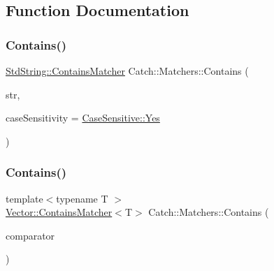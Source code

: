\subsection{Function Documentation}
\mbox{\label{namespace_catch_1_1_matchers_a1f6c2accdc6cd75a84d7112dcad647b4}} 
\subsubsection{\texorpdfstring{Contains()}{Contains()}\hspace{0.1cm}{\footnotesize\ttfamily [1/2]}}
{\footnotesize\ttfamily \mbox{\hyperlink{struct_catch_1_1_matchers_1_1_std_string_1_1_contains_matcher}{Std\+String\+::\+Contains\+Matcher}} Catch\+::\+Matchers\+::\+Contains (\begin{DoxyParamCaption}\item[{std\+::string const \&}]{str,  }\item[{\mbox{\hyperlink{struct_catch_1_1_case_sensitive_aad49d3aee2d97066642fffa919685c6a}{Case\+Sensitive\+::\+Choice}}}]{case\+Sensitivity = {\ttfamily \mbox{\hyperlink{struct_catch_1_1_case_sensitive_aad49d3aee2d97066642fffa919685c6aa7c5550b69ec3c502e6f609b67f9613c6}{Case\+Sensitive\+::\+Yes}}} }\end{DoxyParamCaption})}

\mbox{\label{namespace_catch_1_1_matchers_a4b3621740dc515216ad31ab827d4092c}} 
\subsubsection{\texorpdfstring{Contains()}{Contains()}\hspace{0.1cm}{\footnotesize\ttfamily [2/2]}}
{\footnotesize\ttfamily template$<$typename T $>$ \\
\mbox{\hyperlink{struct_catch_1_1_matchers_1_1_vector_1_1_contains_matcher}{Vector\+::\+Contains\+Matcher}}$<$T$>$ Catch\+::\+Matchers\+::\+Contains (\begin{DoxyParamCaption}\item[{std\+::vector$<$ T $>$ const \&}]{comparator }\end{DoxyParamCaption})}



